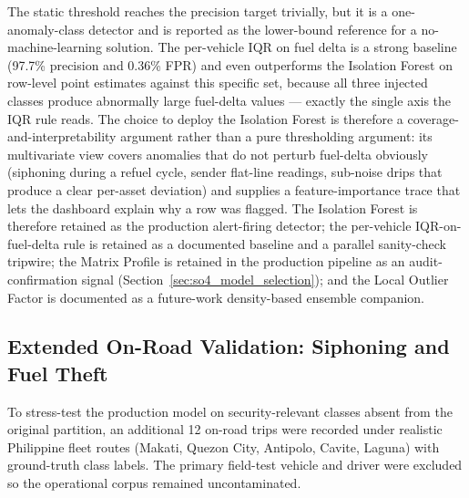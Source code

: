 The static threshold reaches the precision target trivially, but it is a one-anomaly-class detector and is reported as the lower-bound reference for a no-machine-learning solution. The per-vehicle IQR on fuel delta is a strong baseline (97.7\% precision and 0.36\% FPR) and even outperforms the Isolation Forest on row-level point estimates against this specific set, because all three injected classes produce abnormally large fuel-delta values --- exactly the single axis the IQR rule reads. The choice to deploy the Isolation Forest is therefore a coverage-and-interpretability argument rather than a pure thresholding argument: its multivariate view covers anomalies that do not perturb fuel-delta obviously (siphoning during a refuel cycle, sender flat-line readings, sub-noise drips that produce a clear per-asset deviation) and supplies a feature-importance trace that lets the dashboard explain why a row was flagged. The Isolation Forest is therefore retained as the production alert-firing detector; the per-vehicle IQR-on-fuel-delta rule is retained as a documented baseline and a parallel sanity-check tripwire; the Matrix Profile is retained in the production pipeline as an audit-confirmation signal (Section~\ref{sec:so4_model_selection}); and the Local Outlier Factor is documented as a future-work density-based ensemble companion.

\subsection{Extended On-Road Validation: Siphoning and Fuel Theft}
To stress-test the production model on security-relevant classes absent from the original partition, an additional 12 on-road trips were recorded under realistic Philippine fleet routes (Makati, Quezon City, Antipolo, Cavite, Laguna) with ground-truth class labels. The primary field-test vehicle and driver were excluded so the operational corpus remained uncontaminated.


